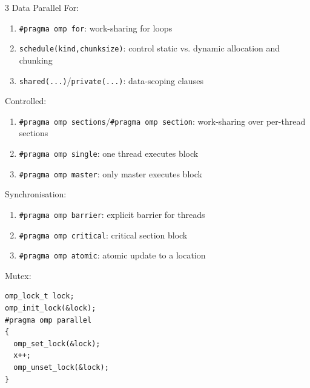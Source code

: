 \documentclass[12pt, a4paper]{article}
\begin{document}
\begin{multicols*}{3}
Data Parallel For:
\begin{enumerate}[\roman*.]
  \item \lstinline|#pragma omp for|: work-sharing for loops
  \item \lstinline|schedule(kind,chunksize)|: control static vs. dynamic allocation and chunking 
  \item \lstinline|shared(...)|/\lstinline|private(...)|: data-scoping clauses 
\end{enumerate}

Controlled:
\begin{enumerate}[\roman*.]
  \item \lstinline|#pragma omp sections|/\lstinline|#pragma omp section|: work-sharing over per-thread sections
  \item \lstinline|#pragma omp single|: one thread executes block
  \item \lstinline|#pragma omp master|: only master executes block
\end{enumerate}

Synchronisation:
\begin{enumerate}[\roman*.]
  \item \lstinline|#pragma omp barrier|: explicit barrier for threads
  \item \lstinline|#pragma omp critical|: critical section block 
  \item \lstinline|#pragma omp atomic|: atomic update to a location 
\end{enumerate}

Mutex:
\begin{lstlisting}[basicstyle=\ttfamily\scriptsize]
omp_lock_t lock;
omp_init_lock(&lock);
#pragma omp parallel
{
  omp_set_lock(&lock);
  x++;
  omp_unset_lock(&lock);
}
\end{lstlisting}

\end{multicols*}
\end{document}
